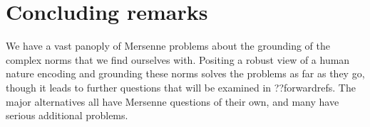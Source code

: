 \section{Concluding remarks}
We have a vast panoply of Mersenne problems about the grounding of the complex norms that we find ourselves with.
Positing a robust view of a human nature encoding and grounding these norms solves the problems as far as they
go, though it leads to further questions that will be examined in ??forwardrefs. The major alternatives all
have Mersenne questions of their own, and many have serious additional problems.
\chaptertail 
